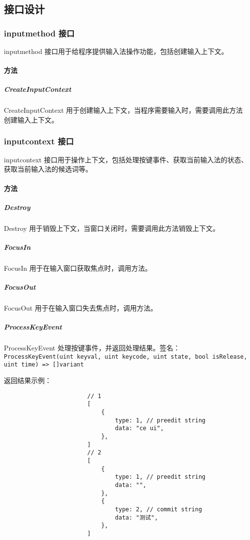 \documentclass{utart}
\begin{document}
    \subsection{接口设计}

        \subsubsection{inputmethod 接口}
            \par inputmethod 接口用于给程序提供输入法操作功能，包括创建输入上下文。
            \paragraph{方法}
                \subparagraph{CreateInputContext}
                    \par CreateInputContext 用于创建输入上下文，当程序需要输入时，需要调用此方法创建输入上下文。

        \subsubsection{inputcontext 接口}
            \par inputcontext 接口用于操作上下文，包括处理按键事件、获取当前输入法的状态、获取当前输入法的候选词等。
            \paragraph{方法}
                \subparagraph{Destroy}
                    \par Destroy 用于销毁上下文，当窗口关闭时，需要调用此方法销毁上下文。
                \subparagraph{FocusIn}
                    \par FocusIn 用于在输入窗口获取焦点时，调用方法。
                \subparagraph{FocusOut}
                    \par FocusOut 用于在输入窗口失去焦点时，调用方法。
                \subparagraph{ProcessKeyEvent}
                    \par ProcessKeyEvent 处理按键事件，并返回处理结果。签名：\texttt{ProcessKeyEvent(uint keyval, uint keycode, uint state, bool isRelease, uint time) => []variant}
                    \par 返回结果示例：
                    \begin{verbatim}
                        // 1
                        [
                            {
                                type: 1, // preedit string
                                data: "ce ui",
                            },
                        ]
                        // 2
                        [
                            {
                                type: 1, // preedit string
                                data: "",
                            },
                            {
                                type: 2, // commit string
                                data: "测试",
                            },
                        ]
                    \end{verbatim}

\end{document}
